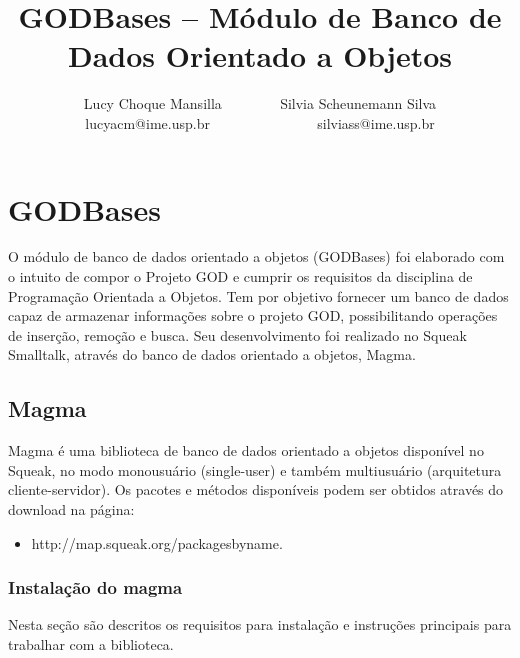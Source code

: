 \documentclass[a4paper, 10pt]{article}
\title{GODBases – Módulo de Banco de Dados Orientado a Objetos}
\author{Lucy Choque Mansilla ~~~~~~~ Silvia Scheunemann Silva\\
lucyacm@ime.usp.br ~~~~~~~~~~~~~~ silviass@ime.usp.br}
\begin{document}
\maketitle

\section{GODBases}

O módulo de banco de dados orientado a objetos (GODBases) foi elaborado com o intuito de compor o Projeto GOD e cumprir os requisitos da disciplina de Programação Orientada a Objetos. Tem por objetivo fornecer um banco de dados capaz de armazenar informações sobre o projeto GOD, possibilitando operações de inserção, remoção e busca. Seu desenvolvimento foi realizado no Squeak Smalltalk, através do banco de dados orientado a objetos, Magma.    


\subsection{Magma}
Magma é uma biblioteca de banco de dados orientado a objetos disponível no Squeak, no modo monousuário (single-user) e também multiusuário (arquitetura cliente-servidor). Os pacotes e métodos disponíveis podem ser obtidos através do download na página:
\begin{itemize}
\item{http://map.squeak.org/packagesbyname.}
\end{itemize}

\subsubsection{Instalação do magma}
Nesta seção são descritos os requisitos para instalação e instruções principais para trabalhar com a biblioteca.
\end{document}
